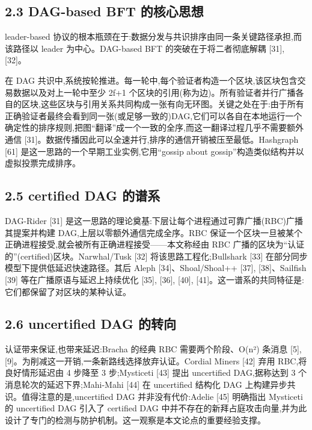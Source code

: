\documentclass[UTF8,fontset=windows,a4paper,11pt]{ctexart}
\begin{document}
\subsection{2.3 DAG-based BFT
的核心思想}\label{dag-based-bft-ux7684ux6838ux5fc3ux601dux60f3}

leader-based
协议的根本瓶颈在于:数据分发与共识排序由同一条关键路径承担,而该路径以
leader 为中心。DAG-based BFT 的突破在于将二者彻底解耦 {[}31{]},
{[}32{]}。

在 DAG
共识中,系统按轮推进。每一轮中,每个验证者构造一个区块,该区块包含交易数据以及对上一轮中至少
2f+1
个区块的引用(称为边)。所有验证者并行广播各自的区块,这些区块与引用关系共同构成一张有向无环图。关键之处在于:由于所有正确验证者最终会看到同一张(或足够一致的)DAG,它们可以各自在本地运行一个确定性的排序规则,把图``翻译''成一个一致的全序,而这一翻译过程几乎不需要额外通信
{[}31{]}。数据传播因此可以全速并行,排序的通信开销被压至最低。Hashgraph
{[}61{]} 是这一思路的一个早期工业实例,它用``gossip about
gossip''构造类似结构并以虚拟投票完成排序。

\subsection{2.5 certified DAG
的谱系}\label{certified-dag-ux7684ux8c31ux7cfb}

DAG-Rider {[}31{]}
是这一思路的理论奠基:下层让每个进程通过可靠广播(RBC)广播其提案并构建 DAG,上层以零额外通信完成全序。RBC 保证一个区块一旦被某个正确进程接受,就会被所有正确进程接受------本文称经由 RBC 广播的区块为``认证的''(certified)区块。Narwhal/Tusk {[}32{]} 将该思路工程化;Bullshark {[}33{]} 在部分同步模型下提供低延迟快速路径。其后 Aleph {[}34{]}、Shoal/Shoal++ {[}37{]}, {[}38{]}、Sailfish {[}39{]} 等在广播原语与延迟上持续优化 {[}35{]}, {[}36{]}, {[}40{]}, {[}41{]}。这一谱系的共同特征是:它们都保留了对区块的某种认证。

\subsection{2.6 uncertified DAG
的转向}\label{uncertified-dag-ux7684ux8f6cux5411}

认证带来保证,也带来延迟:Bracha 的经典 RBC 需要两个阶段、O(n²) 条消息 {[}5{]}, {[}9{]}。为削减这一开销,一条新路线选择放弃认证。Cordial Miners {[}42{]} 弃用 RBC,将良好情形延迟由 4 步降至 3 步;Mysticeti {[}43{]} 提出 uncertified DAG,据称达到 3 个消息轮次的延迟下界;Mahi-Mahi {[}44{]} 在 uncertified 结构化 DAG 上构建异步共识。值得注意的是,uncertified DAG 并非没有代价:Adelie {[}45{]} 明确指出 Mysticeti 的 uncertified DAG 引入了 certified DAG 中并不存在的新拜占庭攻击向量,并为此设计了专门的检测与防护机制。这一观察是本文论点的重要经验支撑。
\end{document}
